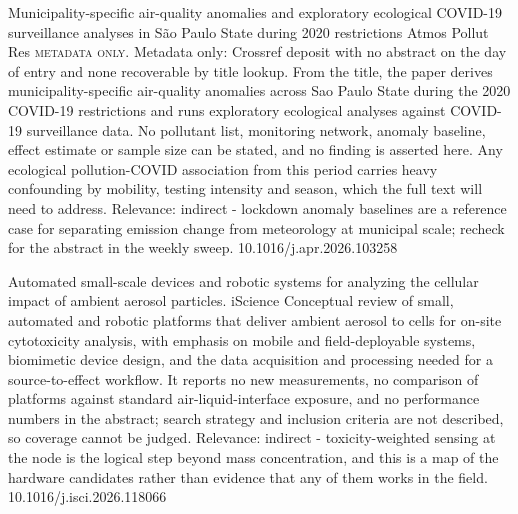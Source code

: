 \documentclass[10pt]{article}
\begin{document}
{Municipality-specific air-quality anomalies and exploratory ecological COVID-19 surveillance analyses in São Paulo State during 2020 restrictions}
{Atmos Pollut Res}
{\textsc{metadata only.} Metadata only: Crossref deposit with no abstract on the day of entry and none recoverable by title lookup. From the title, the paper derives municipality-specific air-quality anomalies across Sao Paulo State during the 2020 COVID-19 restrictions and runs exploratory ecological analyses against COVID-19 surveillance data. No pollutant list, monitoring network, anomaly baseline, effect estimate or sample size can be stated, and no finding is asserted here. Any ecological pollution-COVID association from this period carries heavy confounding by mobility, testing intensity and season, which the full text will need to address. Relevance: indirect - lockdown anomaly baselines are a reference case for separating emission change from meteorology at municipal scale; recheck for the abstract in the weekly sweep.}
{10.1016/j.apr.2026.103258}

\par{}\baselineskip{}\baselineskip
{}

{Automated small-scale devices and robotic systems for analyzing the cellular impact of ambient aerosol particles.}
{iScience}
{Conceptual review of small, automated and robotic platforms that deliver ambient aerosol to cells for on-site cytotoxicity analysis, with emphasis on mobile and field-deployable systems, biomimetic device design, and the data acquisition and processing needed for a source-to-effect workflow. It reports no new measurements, no comparison of platforms against standard air-liquid-interface exposure, and no performance numbers in the abstract; search strategy and inclusion criteria are not described, so coverage cannot be judged. Relevance: indirect - toxicity-weighted sensing at the node is the logical step beyond mass concentration, and this is a map of the hardware candidates rather than evidence that any of them works in the field.}
{10.1016/j.isci.2026.118066}
\end{document}
